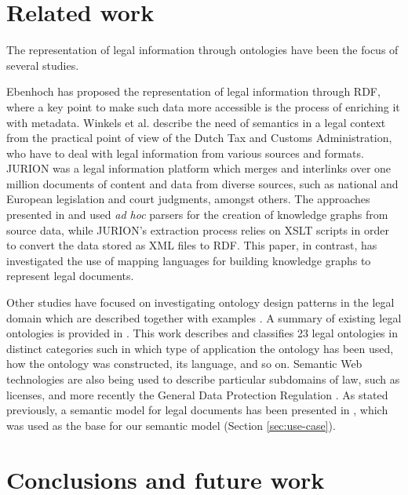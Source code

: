 \documentclass[runningheads]{llncs}
\begin{document}
\section{Related work}\label{sec:relatedwork}
The representation of legal information through ontologies have been the focus of several studies.

Ebenhoch \cite{ebenhoch2001legal} has proposed the representation of legal information through RDF, where a key point to make such data more accessible is the process of enriching it with metadata. Winkels et al. \cite{Winkels} describe the need of semantics in a legal context from the practical point of view of the Dutch Tax and Customs Administration, who have to deal with legal information from various sources and formats. JURION \cite{10.1007/978-3-319-34129-3_40} was a legal information platform which merges and interlinks over one million documents of content and data from diverse sources, such as national and European legislation and court judgments, amongst others. The approaches presented in  \cite{ebenhoch2001legal} and \cite{Winkels} used \textit{ad hoc} parsers for the creation of knowledge graphs from source data, while JURION's extraction process relies on XSLT scripts in order to convert the data stored as XML files to RDF. This paper, in contrast, has investigated the use of mapping languages for building knowledge graphs to represent legal documents.

Other studies have focused on investigating ontology design patterns in the legal domain which are described together with examples \cite{griffo2016pattern}. A summary of existing legal ontologies is provided in \cite{Breuker:2009:FCD:1563987.1563990}. This work describes and classifies 23 legal ontologies in distinct categories such in which type of application the ontology has been used, how the ontology was constructed, its language, and so on. Semantic Web technologies are also being used to describe particular subdomains of law, such as licenses, and more recently the General Data Protection Regulation \cite{DBLP:conf/esws/PanditFOL18}. As stated previously, a semantic model for legal documents has been presented in \cite{6142232}, which was used as the base for our semantic model (Section \ref{sec:use-case}).


\section{Conclusions and future work}\label{sec:conc}
\end{document}
